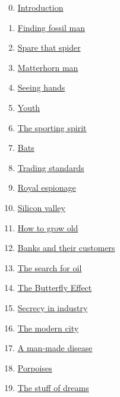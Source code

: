 \documentclass[11pt]{article}
\begin{document}
\begin{multicols}{2}
	\begin{enumerate}
		\setcounter{enumi}{-1}
		\item \href{https://mp.weixin.qq.com/s/fMXqHUC40rJTZKPifAuWGA}{Introduction}	%
		\item \href{https://mp.weixin.qq.com/s/xt_Rar71zoY2Kl9wMO3inw}{Finding fossil man}	%
		\item \href{https://mp.weixin.qq.com/s/J1fYqs4gIThaeyovLyvzow}{Spare that spider}	%
		\item \href{https://mp.weixin.qq.com/s/kMdqkQKdVml_x0x93hA9mA}{Matterhorn man}	%
		\item \href{https://mp.weixin.qq.com/s/mHO8E4YGEVL7ThSRXSPjjQ}{Seeing hands}	%
		\item \href{https://mp.weixin.qq.com/s/dXLK0N1mobVvJtOj3KlfRg}{Youth}	%
		\item \href{https://mp.weixin.qq.com/s/vnr9b9aCJ4bHyQonGFnECg}{The sporting spirit}	%
		\item \href{https://mp.weixin.qq.com/s/rjeqGfg1IC38kutQziw_aQ}{Bats}	%
		\item \href{https://mp.weixin.qq.com/s/6aO_rWkm0ldZ7PbJPKWM-A}{Trading standards}	%
		\item \href{https://mp.weixin.qq.com/s/4exend08mJ1DHEbgvjr-aw}{Royal espionage}	%
		\item \href{https://mp.weixin.qq.com/s/bRFOSnI6SWMtS498O-s7-A}{Silicon valley}	%
		\item \href{https://mp.weixin.qq.com/s/SiyDFH2ZKrNNIlzhJ2ZSow}{How to grow old}	%
		\item \href{https://mp.weixin.qq.com/s/uOAb0AyrZEFdTNqMpwwxOQ}{Banks and their customers}	%
		\item \href{https://mp.weixin.qq.com/s/eUkUZsUTIyyBNcPqiStQ_A}{The search for oil}	%
		\item \href{https://mp.weixin.qq.com/s/vjoNvnrrmgKolDTR4DfUMw}{The Butterfly Effect}	%
		\item \href{https://mp.weixin.qq.com/s/C1u0B-uidDzrUHDIy_1csg}{Secrecy in industry}	%
		\item \href{https://mp.weixin.qq.com/s/5yvzKVBhqpSZfC8UMTkdSw}{The modern city}	%
		\item \href{https://mp.weixin.qq.com/s/NtLa4A9ieRZ013zgbWisqQ}{A man-made disease}	%
		\item \href{https://mp.weixin.qq.com/s/YA3YaQh62EiQl0iTSyBiCQ}{Porpoises}	%
		\item \href{https://mp.weixin.qq.com/s/inDnrwPh9UA6w-jAGnHd3Q}{The stuff of dreams}	%

\end{enumerate}
\end{multicols}
\end{document}
